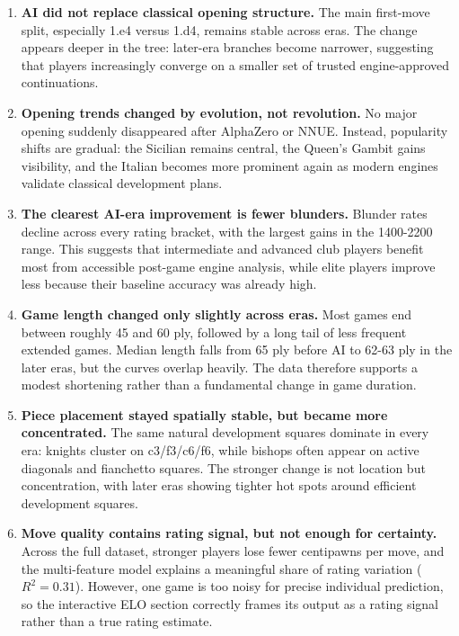 \documentclass[a4paper]{article}
\begin{document}
\begin{enumerate}[itemsep=0.55em, topsep=0.35em]
  \item \textbf{AI did not replace classical opening structure.} The main first-move split, especially 1.e4 versus 1.d4, remains stable across eras. The change appears deeper in the tree: later-era branches become narrower, suggesting that players increasingly converge on a smaller set of trusted engine-approved continuations.

  \item \textbf{Opening trends changed by evolution, not revolution.} No major opening suddenly disappeared after AlphaZero or NNUE. Instead, popularity shifts are gradual: the Sicilian remains central, the Queen's Gambit gains visibility, and the Italian becomes more prominent again as modern engines validate classical development plans.

  \item \textbf{The clearest AI-era improvement is fewer blunders.} Blunder rates decline across every rating bracket, with the largest gains in the 1400-2200 range. This suggests that intermediate and advanced club players benefit most from accessible post-game engine analysis, while elite players improve less because their baseline accuracy was already high.

  \item \textbf{Game length changed only slightly across eras.} Most games end between roughly 45 and 60 ply, followed by a long tail of less frequent extended games. Median length falls from 65 ply before AI to 62-63 ply in the later eras, but the curves overlap heavily. The data therefore supports a modest shortening rather than a fundamental change in game duration.

  \item \textbf{Piece placement stayed spatially stable, but became more concentrated.} The same natural development squares dominate in every era: knights cluster on c3/f3/c6/f6, while bishops often appear on active diagonals and fianchetto squares. The stronger change is not location but concentration, with later eras showing tighter hot spots around efficient development squares.

  \item \textbf{Move quality contains rating signal, but not enough for certainty.} Across the full dataset, stronger players lose fewer centipawns per move, and the multi-feature model explains a meaningful share of rating variation ($R^2 = 0.31$). However, one game is too noisy for precise individual prediction, so the interactive ELO section correctly frames its output as a rating signal rather than a true rating estimate.
\end{enumerate}
\end{document}
